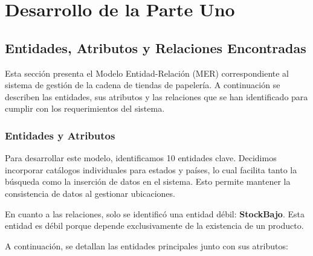 \documentclass[10pt,openany]{book}
\begin{document}
\chapter{Desarrollo de la Parte Uno}

\section{Entidades, Atributos y Relaciones Encontradas}

Esta sección presenta el Modelo Entidad-Relación (MER) correspondiente al sistema de gestión de la cadena de tiendas de papelería. A continuación se describen las entidades, sus atributos y las relaciones que se han identificado para cumplir con los requerimientos del sistema.

\subsection{Entidades y Atributos}

Para desarrollar este modelo, identificamos 10 entidades clave. Decidimos incorporar catálogos individuales para estados y países, lo cual facilita tanto la búsqueda como la inserción de datos en el sistema. Esto permite mantener la consistencia de datos al gestionar ubicaciones.

En cuanto a las relaciones, solo se identificó una entidad débil: \textbf{StockBajo}. Esta entidad es débil porque depende exclusivamente de la existencia de un producto.

A continuación, se detallan las entidades principales junto con sus atributos:
\end{document}

